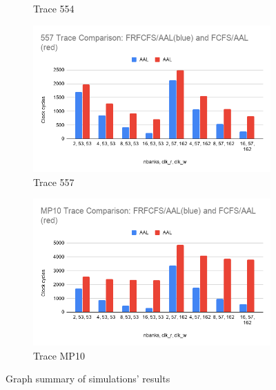 \documentclass[letterpaper, 11pt]{article}
\begin{document}
\begin{figure}[htbp!]
\begin{subfigure}[b]{.48\linewidth}
		\caption{Trace 554}
		\label{fig6c}
	\end{subfigure}
	\hfill %
	\begin{subfigure}[b]{.48\linewidth}
		\includegraphics[width=\textwidth]{557_results_graph.png}
		\caption{Trace 557}
		\label{fig6d}
	\end{subfigure}

	\begin{subfigure}[b]{.48\linewidth}
		\includegraphics[width=\textwidth]{MP10_results_graph.png}
		\caption{Trace MP10}
		\label{fig6e}
	\end{subfigure}
\caption{Graph summary of simulations' results}
\end{figure}
\end{document}
